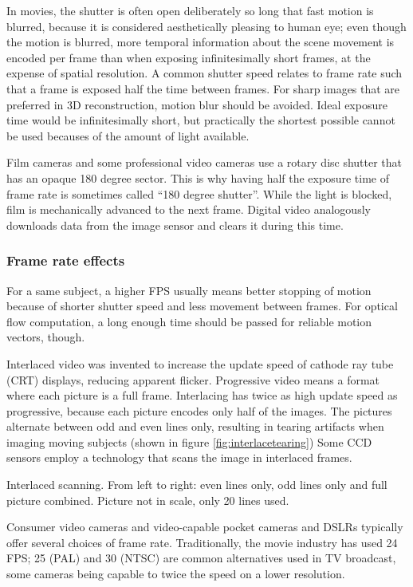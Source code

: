 In movies, the shutter is often open deliberately so long that fast motion is blurred, because it is considered aesthetically pleasing to human eye; even though the motion is blurred, more temporal information about the scene movement is encoded per frame than when exposing infinitesimally short frames, at the expense of spatial resolution.
A common shutter speed relates to frame rate such that a frame is exposed half the time between frames.
\cite{wilson2004anton}
For sharp images that are preferred in 3D reconstruction, motion blur should be avoided.
Ideal exposure time would be infinitesimally short, but practically the shortest possible cannot be used becauses of the amount of light available.

Film cameras and some professional video cameras use a rotary disc shutter that has an opaque 180 degree sector.
This is why having half the exposure time of frame rate is sometimes called ``180 degree shutter''.
While the light is blocked, film is mechanically advanced to the next frame.
Digital video analogously downloads data from the image sensor and clears it during this time.


\subsubsection{Frame rate effects} %

For a same subject, a higher FPS usually means better stopping of motion because of shorter shutter speed and less movement between frames.
For optical flow computation, a long enough time should be passed for reliable motion vectors, though.

Interlaced video was invented to increase the update speed of cathode ray tube (CRT) displays, reducing apparent flicker.
Progressive video means a format where each picture is a full frame.
Interlacing has twice as high update speed as progressive, because each picture encodes only half of the images.
The pictures alternate between odd and even lines only, resulting in tearing artifacts when imaging moving subjects (shown in figure \ref{fig:interlacetearing})
Some CCD sensors employ a technology that scans the image in interlaced frames.

{Interlaced scanning. From left to right: even lines only, odd lines only and full picture combined. Picture not in scale, only 20 lines used.}

Consumer video cameras and video-capable pocket cameras and DSLRs typically offer several choices of frame rate. Traditionally, the movie industry has used 24 FPS; 25 (PAL) and 30 (NTSC) are common alternatives used in TV broadcast, some cameras being capable to twice the speed on a lower resolution.

